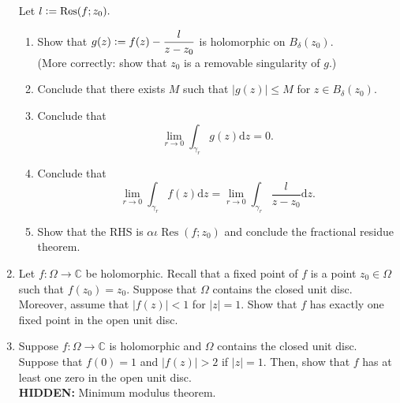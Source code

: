 \documentclass[12pt]{article}
\theoremstyle{definition}
\numberwithin{thm}{section}
\newcommand{\Res}{\operatorname{Res}}
\newcommand{\hint}[1]{\textbf{HIDDEN:} {\color[rgb]{0.95, 0.95, 0.95}#1}}
\begin{document}
\begin{enumerate}
	Let $l \vcentcolon= \Res(f; z_0).$ \begin{enumerate}
		\item Show that $g(z) \vcentcolon= f(z) - \dfrac{l}{z - z_0}$ is holomorphic on $B_\delta(z_0).$\\
		(More correctly: show that $z_0$ is a removable singularity of $g.$)
		\item Conclude that there exists $M$ such that $|g(z)| \le M$ for $z \in B_\delta(z_0).$
		\item Conclude that
		\begin{equation*} 
			\lim_{r\to 0}\int_{\gamma_r}^{} g(z) {\mathrm{d}}z = 0.
		\end{equation*}
		\item Conclude that
		\begin{equation*} 
			\lim_{r\to 0}\int_{\gamma_r}^{} f(z) {\mathrm{d}}z = \lim_{r\to 0}\int_{\gamma_r}^{} \dfrac{l}{z - z_0} {\mathrm{d}}z.
		\end{equation*}
		\item Show that the RHS is $\alpha\iota\Res(f; z_0)$ and conclude the fractional residue theorem.
	\end{enumerate} 

	\item Let $f:\Omega\to\mathbb{C}$ be holomorphic. Recall that a fixed point of $f$ is a point $z_0 \in \Omega$ such that $f(z_0) = z_0.$ Suppose that $\Omega$ contains the closed unit disc. Moreover, assume that $|f(z)| < 1$ for $|z| = 1.$ Show that $f$ has exactly one fixed point in the open unit disc.
	\item Suppose $f:\Omega\to\mathbb{C}$ is holomorphic and $\Omega$ contains the closed unit disc. Suppose that $f(0) = 1$ and $|f(z)| > 2$ if $|z| = 1.$ Then, show that $f$ has at least one zero in the open unit disc.\\
	\hint{Minimum modulus theorem.}
\end{enumerate}
\end{document}
